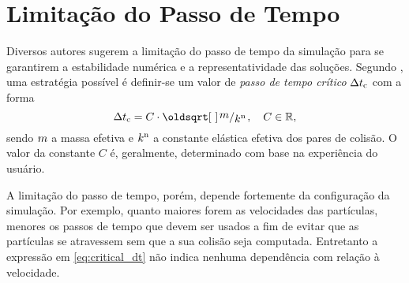 




\section{Limitação do Passo de Tempo}

Diversos autores sugerem a limitação do passo de tempo da simulação para se garantirem a estabilidade numérica e a representatividade das soluções. Segundo , uma estratégia possível é definir-se um valor de \textit{passo de tempo crítico} \(\Delta t_{\text{c}}\) com a forma
\begin{equation} \label{eq:critical_dt}
	\criticalDt = C\cdot\sqrt{\bigslant{\mass}{\effectiveNormalElastic}},\quad C\in\real,
\end{equation}
sendo \(m\) a massa efetiva e \(k^{\text{n}}\) a constante elástica efetiva dos pares de colisão. O valor da constante \(C\) é, geralmente, determinado com base na experiência do usuário.

A limitação do passo de tempo, porém, depende fortemente da configuração da simulação. Por exemplo, quanto maiores forem as velocidades das partículas, menores os passos de tempo que devem ser usados a fim de evitar que as partículas se atravessem sem que a sua colisão seja computada. Entretanto a expressão em \eqref{eq:critical_dt} não indica nenhuma dependência com relação à velocidade.

